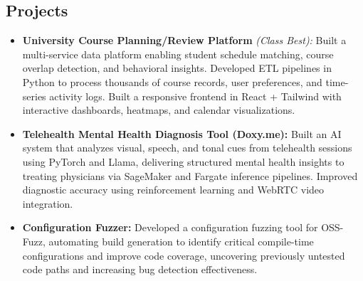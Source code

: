 \documentclass[11pt,letterpaper]{article}
\begin{document}
\vspace{-1em}
\subsection*{\Large Projects}
\begin{itemize}[leftmargin=1em,noitemsep]
\item \textbf{University Course Planning/Review Platform} \emph{(Class Best):} Built a multi-service data platform enabling student schedule matching, course overlap detection, and behavioral insights. Developed ETL pipelines in Python to process thousands of course records, user preferences, and time-series activity logs. Built a responsive frontend in React + Tailwind with interactive dashboards, heatmaps, and calendar visualizations.
\item \textbf{Telehealth Mental Health Diagnosis Tool (Doxy.me):} Built an AI system that analyzes visual, speech, and tonal cues from telehealth sessions using PyTorch and Llama, delivering structured mental health insights to treating physicians via SageMaker and Fargate inference pipelines. Improved diagnostic accuracy using reinforcement learning and WebRTC video integration.
\item \textbf{Configuration Fuzzer:} Developed a configuration fuzzing tool for OSS-Fuzz, automating build generation to identify critical compile-time configurations and improve code coverage, uncovering previously untested code paths and increasing bug detection effectiveness.
\end{itemize}
\end{document}
